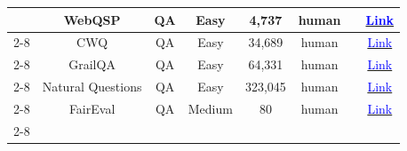 \begin{table}[!htp]
{\begin{tabular}{c|c|c|c|c|c|c|c}
                                                                                  & WebQSP                 & QA                      & Easy                & 4,737            & human               & \cite{ma2024debate}                                                                                                                                                             & \href{https://www.microsoft.com/en-us/research/publication/the-value-of-semantic-parse-labeling-for-knowledge-base-question-answering-2/}{\textcolor{blue}{Link}} \\ \cline{2-8}
                                                                                  & CWQ                    & QA                      & Easy                & 34,689           & human               & \cite{ma2024debate}                                                                                                                                                             & \href{https://github.com/alontalmor/WebAsKB?tab=readme-ov-file}{\textcolor{blue}{Link}}                                                                           \\ \cline{2-8}
                                                                                  & GrailQA                & QA                      & Easy                & 64,331           & human               & \cite{ma2024debate}                                                                                                                                                             & \href{https://dki-lab.github.io/GrailQA/}{\textcolor{blue}{Link}}                                                                                                 \\ \cline{2-8}
                                                                                  & Natural Questions      & QA                      & Easy                & 323,045          & human               & \cite{wu2023autogen}                                                                                                                                                            & \href{https://ai.google.com/research/NaturalQuestions}{\textcolor{blue}{Link}}                                                                                    \\ \cline{2-8}
                                                                                  & FairEval               & QA                      & Medium              & 80               & human               & \cite{chan2023chateval}                                                                                                                                                         & \href{https://github.com/i-Eval/FairEval}{\textcolor{blue}{Link}}                                                                                                 \\ \cline{2-8}

\end{tabular}}
\end{table}
